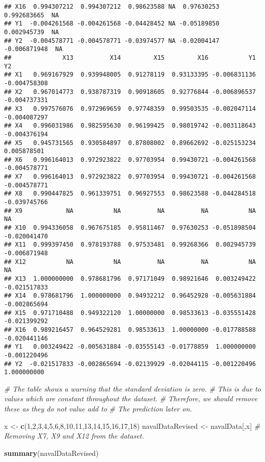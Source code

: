 \documentclass[
]{article}
\newenvironment{Shaded}{\begin{snugshade}}{\end{snugshade}}
\newcommand{\CommentTok}[1]{\textcolor[rgb]{0.56,0.35,0.01}{\textit{#1}}}
\newcommand{\DecValTok}[1]{\textcolor[rgb]{0.00,0.00,0.81}{#1}}
\newcommand{\KeywordTok}[1]{\textcolor[rgb]{0.13,0.29,0.53}{\textbf{#1}}}
\newcommand{\NormalTok}[1]{#1}
\newcommand{\StringTok}[1]{\textcolor[rgb]{0.31,0.60,0.02}{#1}}
\begin{document}
\begin{verbatim}
## X16  0.994307212  0.994307212  0.98623588 NA  0.97630253  0.992683665  NA
## Y1  -0.004261568 -0.004261568 -0.04428452 NA -0.05189850  0.002945739  NA
## Y2  -0.004578771 -0.004578771 -0.03974577 NA -0.02004147 -0.006871948  NA
##              X13          X14         X15         X16           Y1           Y2
## X1   0.969167929  0.939948005  0.91278119  0.93133395 -0.006831136 -0.004758308
## X2   0.967014773  0.938787319  0.90918605  0.92776844 -0.006896537 -0.004737331
## X3   0.997576076  0.972969659  0.97748359  0.99503535 -0.002047114 -0.004087297
## X4   0.996031986  0.982595630  0.96199425  0.98019742 -0.003118643 -0.004376194
## X5   0.945731565  0.930584897  0.87808002  0.89662692 -0.025153234  0.005878501
## X6   0.996164013  0.972923822  0.97703954  0.99430721 -0.004261568 -0.004578771
## X7   0.996164013  0.972923822  0.97703954  0.99430721 -0.004261568 -0.004578771
## X8   0.990447825  0.961339751  0.96927553  0.98623588 -0.044284518 -0.039745766
## X9            NA           NA          NA          NA           NA           NA
## X10  0.994336058  0.967675185  0.95811467  0.97630253 -0.051898504 -0.020041470
## X11  0.999397450  0.978193788  0.97533481  0.99268366  0.002945739 -0.006871948
## X12           NA           NA          NA          NA           NA           NA
## X13  1.000000000  0.978681796  0.97171049  0.98921646  0.003249422 -0.021517833
## X14  0.978681796  1.000000000  0.94932212  0.96452928 -0.005631884 -0.002865694
## X15  0.971710488  0.949322120  1.00000000  0.98533613 -0.035551428 -0.021399292
## X16  0.989216457  0.964529281  0.98533613  1.00000000 -0.017788588 -0.020441146
## Y1   0.003249422 -0.005631884 -0.03555143 -0.01778859  1.000000000 -0.001220496
## Y2  -0.021517833 -0.002865694 -0.02139929 -0.02044115 -0.001220496  1.000000000
\end{verbatim}

\begin{Shaded}
\begin{Highlighting}[]
\CommentTok{# The table shows a warning that the standard deviation is zero. }
\CommentTok{# This is due to values which are constant throughout the dataset.}
\CommentTok{# Therefore, we should remove these as they do not value add to}
\CommentTok{# The prediction later on.}


\NormalTok{x <-}\StringTok{ }\KeywordTok{c}\NormalTok{(}\DecValTok{1}\NormalTok{,}\DecValTok{2}\NormalTok{,}\DecValTok{3}\NormalTok{,}\DecValTok{4}\NormalTok{,}\DecValTok{5}\NormalTok{,}\DecValTok{6}\NormalTok{,}\DecValTok{8}\NormalTok{,}\DecValTok{10}\NormalTok{,}\DecValTok{11}\NormalTok{,}\DecValTok{13}\NormalTok{,}\DecValTok{14}\NormalTok{,}\DecValTok{15}\NormalTok{,}\DecValTok{16}\NormalTok{,}\DecValTok{17}\NormalTok{,}\DecValTok{18}\NormalTok{)}
\NormalTok{navalDataRevised <-}\StringTok{ }\NormalTok{navalData[,x]}
\CommentTok{# Removing X7, X9 and X12 from the dataset.}

\KeywordTok{summary}\NormalTok{(navalDataRevised)}
\end{Highlighting}
\end{Shaded}
\end{document}
